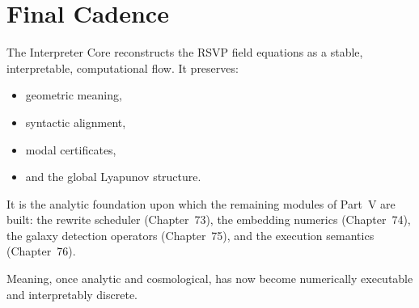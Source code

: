 \section{Final Cadence}

The Interpreter Core reconstructs the RSVP field equations as a
stable, interpretable, computational flow.
It preserves:
\begin{itemize}
\item geometric meaning,
\item syntactic alignment,
\item modal certificates,
\item and the global Lyapunov structure.
\end{itemize}

It is the analytic foundation upon which the remaining modules of
Part~V are built:
the rewrite scheduler (Chapter~73),
the embedding numerics (Chapter~74),
the galaxy detection operators (Chapter~75),
and the execution semantics (Chapter~76).

Meaning, once analytic and cosmological,
has now become numerically executable and interpretably discrete.

